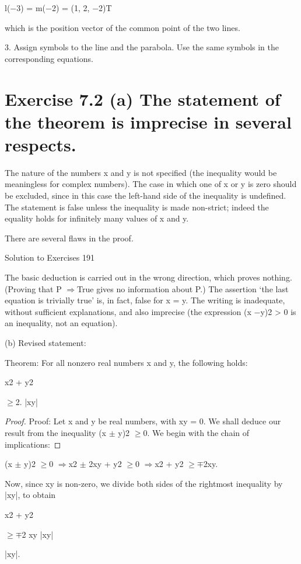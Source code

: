\documentclass[11pt]{article}
\theoremstyle{plain}
\theoremstyle{definition}
\begin{document}
l($-$3) = m($-$2) = (1, 2, $-$2)T

which is the position vector of the common point of the two lines. 

3. Assign symbols to the line and the parabola. Use the same symbols in the corresponding equations.

\section{Exercise 7.2 (a) The statement of the theorem is imprecise in several respects.}

The nature of the numbers x and y is not specified (the inequality would be meaningless for complex numbers). The case in which one of x or y is zero should be excluded, since in this case the left-hand side of the inequality is undefined. The statement is false unless the inequality is made non-strict; indeed the equality holds for infinitely many values of x and y.

There are several flaws in the proof.

Solution to Exercises 191

The basic deduction is carried out in the wrong direction, which proves nothing. (Proving that P $\Rightarrow$True gives no information about P.) The assertion `the last equation is trivially true' is, in fact, false for x = y. The writing is inadequate, without sufficient explanations, and also imprecise (the expression (x $-$y)2 > 0 is an inequality, not an equation).

(b) Revised statement:

Theorem: For all nonzero real numbers x and y, the following holds:

x2 + y2

$\geq$2. |xy|

\begin{proof}
Proof: Let x and y be real numbers, with xy = 0. We shall deduce our result from the inequality (x $\pm$ y)2 $\geq$0. We begin with the chain of implications:
\end{proof}

(x $\pm$ y)2 $\geq$0 $\Rightarrow$x2 $\pm$ 2xy + y2 $\geq$0 $\Rightarrow$x2 + y2 $\geq$$\mp$2xy.

Now, since xy is non-zero, we divide both sides of the rightmost inequality by |xy|, to obtain

x2 + y2

$\geq$$\mp$2 xy |xy|

|xy|.
\end{document}
